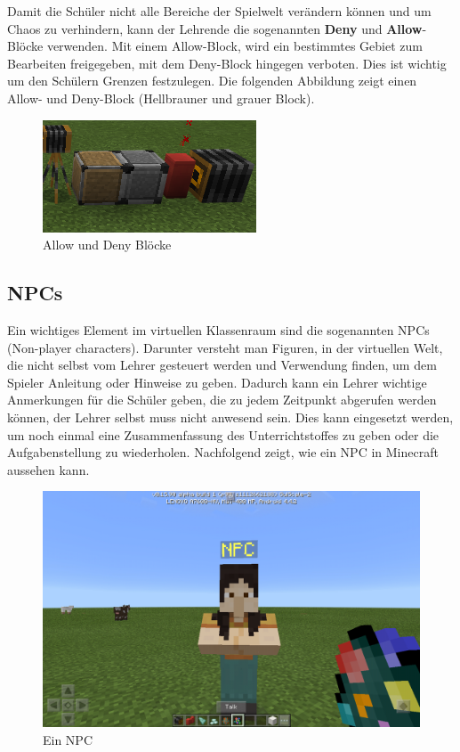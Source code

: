 Damit die Schüler nicht alle Bereiche der Spielwelt verändern können und um Chaos zu verhindern, kann der Lehrende die sogenannten \textbf{Deny} und \textbf{Allow}-Blöcke verwenden. Mit einem Allow-Block, wird ein bestimmtes Gebiet zum Bearbeiten freigegeben, mit dem Deny-Block hingegen verboten. Dies ist wichtig um den Schülern Grenzen festzulegen.
Die folgenden Abbildung zeigt einen Allow- und Deny-Block (Hellbrauner und grauer Block).

\begin{figure}[ht]
	\centering
	\includegraphics{images/AllowAndDenyBlocks.png}
	\caption{Allow und Deny Blöcke \cite{GamepediaMinecraft}}
	\label{allowDenyBlocks}
\end{figure}

\subsection{NPCs}
\label{npcs}

Ein wichtiges Element im virtuellen Klassenraum sind die sogenannten NPCs (Non-player characters).
Darunter versteht man Figuren, in der virtuellen Welt, die nicht selbst vom Lehrer gesteuert werden und Verwendung finden, um dem Spieler Anleitung oder Hinweise zu geben. Dadurch kann ein Lehrer wichtige Anmerkungen für die Schüler geben, die zu jedem Zeitpunkt abgerufen werden können, der Lehrer selbst muss nicht anwesend sein.
Dies kann eingesetzt werden, um noch einmal eine Zusammenfassung des Unterrichtstoffes zu geben oder die Aufgabenstellung zu wiederholen. Nachfolgend zeigt, wie ein NPC in Minecraft aussehen kann.

\begin{figure}[ht]
	\centering
	\includegraphics[width=\textwidth,height=\textheight,keepaspectratio]{images/NPC.png}
	\caption{Ein NPC \cite{GamepediaMinecraft}}
	\label{npc}
\end{figure}

